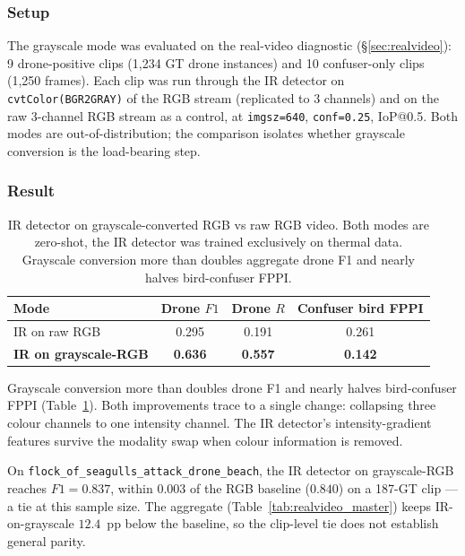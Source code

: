 \subsubsection{Setup}

The grayscale mode was evaluated on the real-video diagnostic (\S\ref{sec:realvideo}): 9 drone-positive clips (1{,}234 GT drone instances) and 10 confuser-only clips (1{,}250 frames). Each clip was run through the IR detector on \texttt{cvtColor(BGR2GRAY)} of the RGB stream (replicated to 3 channels) and on the raw 3-channel RGB stream as a control, at \texttt{imgsz=640}, \texttt{conf=0.25}, IoP@0.5. Both modes are out-of-distribution; the comparison isolates whether grayscale conversion is the load-bearing step.

\subsubsection{Result}

\begin{table}[htbp]
    \centering
    \caption{IR detector on grayscale-converted RGB vs raw RGB video. Both modes are zero-shot, the IR detector was trained exclusively on thermal data. Grayscale conversion more than doubles aggregate drone F1 and nearly halves bird-confuser FPPI.}
    \label{tab:ir_grayscale}
    \begin{tabular}{lccc}
        \toprule
        Mode & Drone $F1$ & Drone $R$ & Confuser bird FPPI \\
        \midrule
        IR on raw RGB             & 0.295 & 0.191 & 0.261 \\
        \textbf{IR on grayscale-RGB} & \textbf{0.636} & \textbf{0.557} & \textbf{0.142} \\
        \bottomrule
    \end{tabular}
\end{table}

Grayscale conversion more than doubles drone F1 and nearly halves bird-confuser FPPI (Table~\ref{tab:ir_grayscale}). Both improvements trace to a single change: collapsing three colour channels to one intensity channel. The IR detector's intensity-gradient features survive the modality swap when colour information is removed.

On \texttt{flock\_of\_seagulls\_attack\_drone\_beach}, the IR detector on grayscale-RGB reaches $F1=0.837$, within $0.003$ of the RGB baseline ($0.840$) on a 187-GT clip --- a tie at this sample size. The aggregate (Table~\ref{tab:realvideo_master}) keeps IR-on-grayscale $12.4$~pp below the baseline, so the clip-level tie does not establish general parity.

